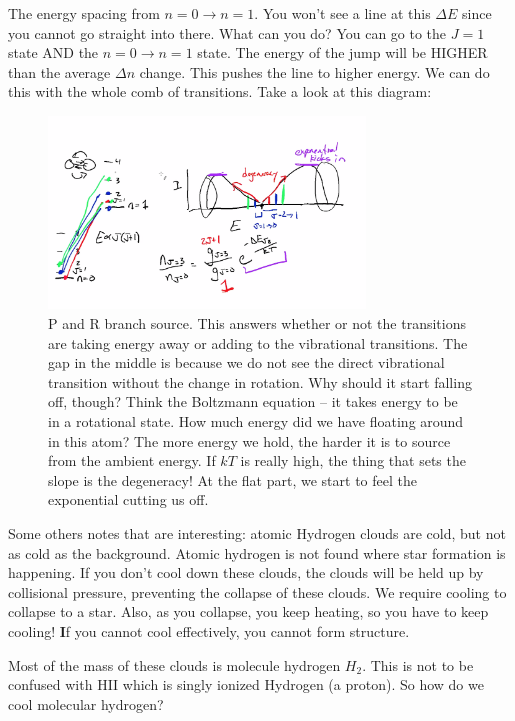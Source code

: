 \documentclass{article}
\begin{document}
The energy spacing from $n= 0 \rightarrow n =1$. You won't see a line at this $\Delta E$ since you cannot go straight into there. What can you do? You can go to the $J=1$ state AND the $n=0 \rightarrow n = 1$ state. The energy of the jump will be HIGHER than the average $\Delta n$ change. This pushes the line to higher energy. We can do this with the whole comb of transitions. Take a look at this diagram:

\begin{figure}
    \centering
    \includegraphics[width=0.75\textwidth]{Screen Shot 2020-10-01 at 11.29.37 AM.png}
    \caption{P and R branch source. This answers whether or not the transitions are taking energy away or adding to the vibrational transitions. The gap in the middle is because we do not see the direct vibrational transition without the change in rotation. Why should it start falling off, though? Think the Boltzmann equation -- it takes energy to be in a rotational state. How much energy did we have floating around in this atom? The more energy we hold, the harder it is to source from the ambient energy. If $kT$ is really high, the thing that sets the slope is the degeneracy! At the flat part, we start to feel the exponential cutting us off. }
    \label{fig:ro_explanation}
\end{figure}

Some others notes that are interesting: atomic Hydrogen clouds are cold, but not as cold as the background. Atomic hydrogen is not found where star formation is happening. If you don't cool down these clouds, the clouds will be held up by collisional pressure, preventing the collapse of these clouds. We require cooling to collapse to a star. Also, as you collapse, you keep heating, so you have to keep cooling! {\textbf If you cannot cool effectively, you cannot form structure.}

Most of the mass of these clouds is molecule hydrogen $H_2$. This is not to be confused with HII which is singly ionized Hydrogen (a proton). So how do we cool molecular hydrogen?
\end{document}
